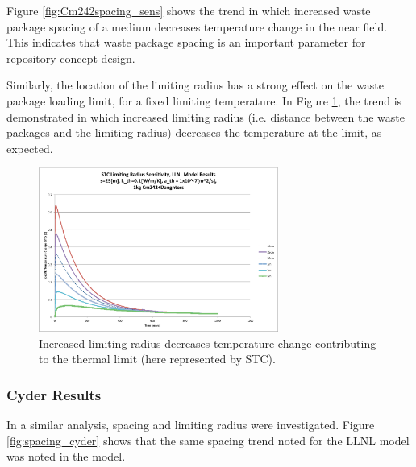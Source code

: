Figure \ref{fig:Cm242spacing_sens} shows the trend in which increased waste 
package spacing of a medium decreases temperature change in the near field. This 
indicates that waste package spacing is an important parameter for repository 
concept design.  

Similarly, the location of the limiting radius has a strong effect on the 
waste package loading limit, for a fixed limiting temperature. In Figure 
\ref{fig:Cm242r_lim_sens}, the trend is demonstrated in which increased limiting 
radius (i.e. distance between the waste packages and the limiting radius) 
decreases the temperature at the limit, as expected.


\begin{figure}[htbp!]
\begin{center}
\includegraphics[width=0.7\textwidth]{./chapters/demonstration/spacing/Cm242r_lim_sens.eps}
\end{center}
\caption[Thermal Sensitivity to $r_{lim}$ and $s$]{Increased limiting radius 
decreases temperature change contributing to the thermal limit
(here represented by \gls{STC}).}
\label{fig:Cm242r_lim_sens}
\end{figure}


\FloatBarrier
\subsubsection{Cyder Results}


In a similar analysis, spacing and limiting radius were investigated. Figure 
\ref{fig:spacing_cyder} shows that the same spacing trend noted for the LLNL model was noted in the \Cyder model. 

